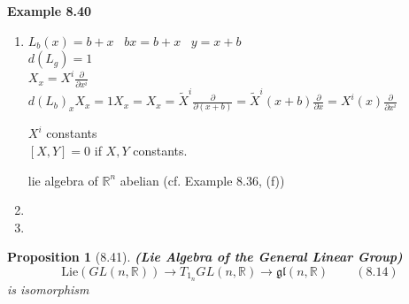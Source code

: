 \documentclass[11pt]{amsart}
\newtheorem{proposition}{Proposition}
\theoremstyle{definition}
\begin{document}
\textbf{Example 8.40}
\begin{enumerate}
\item[(a)] $L_b(x) = b + x$  \quad \quad \, $bx = b + x$ \quad \quad \, $y = x + b$ \\

$d(L_g) = 1$ \\
$X_x = X^i \frac{ \partial }{ \partial x^i }$ \\
$d(L_b)_x X_x = 1 X_x = X_x = \widetilde{X}^i \frac{ \partial }{ \partial (x+b)} = \widetilde{X}^i(x+b) \frac{ \partial }{ \partial x} = X^i(x) \frac{ \partial }{ \partial x^i }$

$X^i$ constants \\

$[X,Y]=0$ if $X,Y$ constants.

lie algebra of $\mathbb{R}^n$ abelian (cf. Example 8.36, (f))
\item[(b)]
\item[(c)]
\end{enumerate}

\begin{proposition}[8.41] \textbf{(Lie Algebra of the General Linear Group)}
  \begin{equation}
    \text{Lie}{(GL(n,\mathbb{R}))} \to T_{1_n}GL(n,\mathbb{R}) \to \mathfrak{gl}{(n,\mathbb{R})} \quad \quad \, (8.14)
\end{equation}
is isomorphism
\end{proposition}
\end{document}
